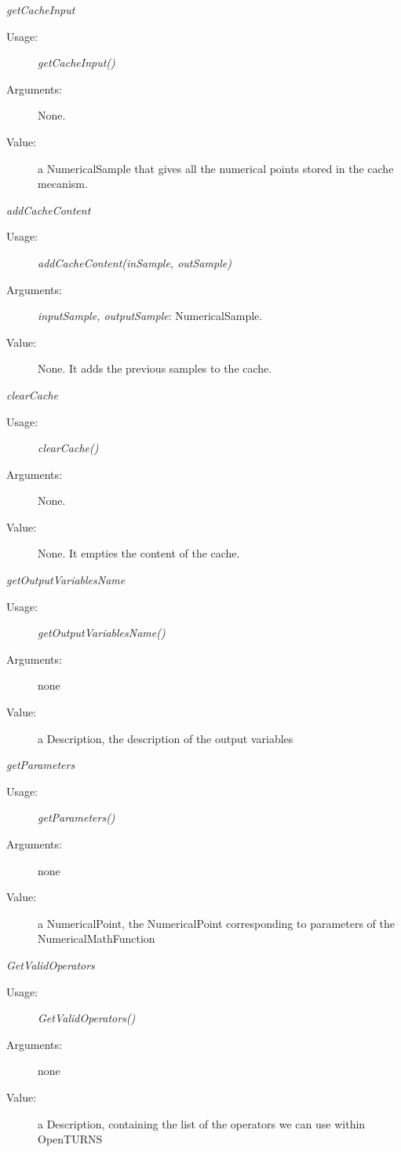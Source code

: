 \begin{description}
\begin{description}
\item \textit{getCacheInput}
\begin{description}
\item[Usage:] \textit{getCacheInput()}
\item[Arguments:] None.
\item[Value:] a NumericalSample that gives all the numerical points stored in the cache mecanism.
\end{description}
\bigskip

\item \textit{addCacheContent}
\begin{description}
\item[Usage:] \textit{addCacheContent(inSample, outSample)}
\item[Arguments:] \textit{inputSample, outputSample}: NumericalSample.
\item[Value:] None. It adds the previous samples to the cache.
\end{description}
\bigskip

\item \textit{clearCache}
\begin{description}
\item[Usage:] \textit{clearCache()}
\item[Arguments:] None.
\item[Value:] None. It empties the content of the cache.
\end{description}
\bigskip


\item \textit{getOutputVariablesName}
\begin{description}
\item[Usage:] \textit{getOutputVariablesName()}
\item[Arguments:] none
\item[Value:] a Description, the description of the output variables
\end{description}
\bigskip


\item \textit{getParameters}
\begin{description}
\item[Usage:] \textit{getParameters()}
\item[Arguments:] none
\item[Value:] a NumericalPoint, the NumericalPoint
corresponding to parameters of the NumericalMathFunction
\end{description}
\bigskip


\item \textit{GetValidOperators}
\begin{description}
\item[Usage:] \textit{GetValidOperators()}
\item[Arguments:] none
\item[Value:] a Description, containing the list of the operators we can use within OpenTURNS
\end{description}
\bigskip



\end{description}
\end{description}
